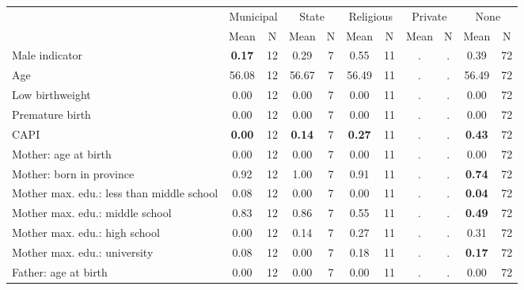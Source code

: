 \begin{tabular}{l c c c c c c c c c c}
\toprule
& \multicolumn{2}{c}{Municipal} & \multicolumn{2}{c}{State} & \multicolumn{2}{c}{Religious} & \multicolumn{2}{c}{Private} & \multicolumn{2}{c}{None} \\
& \scriptsize Mean & \scriptsize N & \scriptsize Mean & \scriptsize N & \scriptsize Mean & \scriptsize N & \scriptsize Mean & \scriptsize N & \scriptsize Mean & \scriptsize N \\
\midrule
Male indicator & \textbf{     0.17} &        12 &      0.29 &         7 &      0.55 &        11 &         . & . &      0.39 &        72 \\
Age &     56.08 &        12 &     56.67 &         7 &     56.49 &        11 &         . & . &     56.49 &        72 \\
Low birthweight &      0.00 &        12 &      0.00 &         7 &      0.00 &        11 &         . & . &      0.00 &        72 \\
Premature birth &      0.00 &        12 &      0.00 &         7 &      0.00 &        11 &         . & . &      0.00 &        72 \\
CAPI & \textbf{     0.00} &        12 & \textbf{     0.14} &         7 & \textbf{     0.27} &        11 &         . & . & \textbf{     0.43} &        72 \\
Mother: age at birth &      0.00 &        12 &      0.00 &         7 &      0.00 &        11 &         . & . &      0.00 &        72 \\
Mother: born in province &      0.92 &        12 &      1.00 &         7 &      0.91 &        11 &         . & . & \textbf{     0.74} &        72 \\
Mother max. edu.: less than middle school &      0.08 &        12 &      0.00 &         7 &      0.00 &        11 &         . & . & \textbf{     0.04} &        72 \\
Mother max. edu.: middle school &      0.83 &        12 &      0.86 &         7 &      0.55 &        11 &         . & . & \textbf{     0.49} &        72 \\
Mother max. edu.: high school &      0.00 &        12 &      0.14 &         7 &      0.27 &        11 &         . & . &      0.31 &        72 \\
Mother max. edu.: university &      0.08 &        12 &      0.00 &         7 &      0.18 &        11 &         . & . & \textbf{     0.17} &        72 \\
Father: age at birth &      0.00 &        12 &      0.00 &         7 &      0.00 &        11 &         . & . &      0.00 &        72 \\

\end{tabular}
